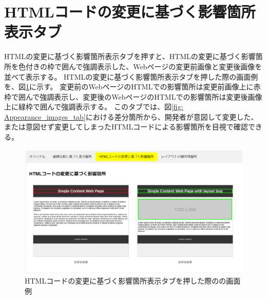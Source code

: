 \section{HTMLコードの変更に基づく影響箇所表示タブ}\label{sec:html_tab}
HTMLの変更に基づく影響箇所表示タブを押すと、HTMLの変更に基づく影響箇所を色付きの枠で囲んで強調表示した、Webページの変更前画像と変更後画像を並べて表示する。
HTMLの変更に基づく影響箇所表示タブを押した際の画面例を、図\ref{fig: Appearance_html_tab}に示す。
変更前のWebページのHTMLでの影響箇所は変更前画像上に赤枠で囲んで強調表示し、変更後のWebページのHTMLでの影響箇所は変更後画像上に緑枠で囲んで強調表示する。
このタブでは、図\ref{fig: Appearance_images_tab}における差分箇所から、開発者が意図して変更した、または意図せず変更してしまったHTMLコードによる影響箇所を目視で確認できる。
\begin{figure}[tp]
    \begin{center}
        \includegraphics[width=1.0\columnwidth]{image/3_html_tab.png}
        \caption{HTMLコードの変更に基づく影響箇所表示タブを押した際の\toolName の画面例}
        \label{fig: Appearance_html_tab}
    \end{center}
\end{figure}



